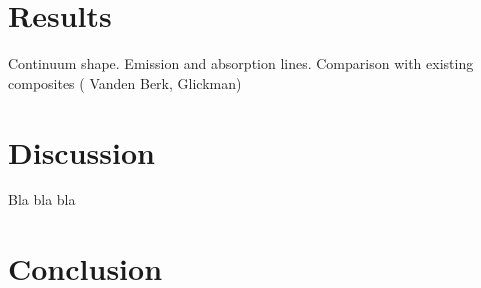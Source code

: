 \documentclass[iop]{emulateapj}
\begin{document}
\section{Results}
Continuum shape. Emission and absorption lines. Comparison with existing composites ( Vanden Berk, Glickman)
\section{Discussion}
Bla bla bla
\section{Conclusion}





\end{document}
